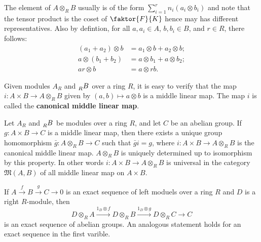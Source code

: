 \documentclass{article}
\begin{document}
The element of $A\otimes_R B$ usually is of the form $\sum_{i=1}^{r}n_{i}(a_{i}\otimes b_{i})$ and note that the tensor product is the coset of $\faktor{F}{K}$ hence may has different representatives. Also by defintion, for all $a,a_{i} \in A$, $b,b_{i} \in B$, and $r \in R$, there follows:
\begin{equation*}
    \begin{aligned}
    (a_{1}+a_{2})\otimes b &= a_{1}\otimes b + a_{2}\otimes b; \\
    a\otimes (b_{1}+b_{2}) &= a\otimes b_{1} + a\otimes b_{2}; \\
    ar\otimes b &= a\otimes rb.
    \end{aligned}
\end{equation*} 

Given modules $A_R$ and $\tensor[_R]{B}{}$ over a ring $R$, it is easy to verify that the map $i:A\times B\to A\otimes_R B$ given by $(a,b)\mapsto a\otimes b$ is a middle linear map. The map $i$ is called the \textbf{canonical middle linear map}.

\begin{theorem}
    Let $A_R$ and $\tensor[_R]{B}{}$ be modules over a ring $R$, and let $C$ be an abelian group. If $g:A\times B\to C$ is a middle linear map, then there exists a unique group homomorphism $\bar{g}:A\otimes_R B\to C$ such that $\bar{g}i=g$, where $i:A\times B \to A\otimes_R B$ is the canonical middle linear map. $A\otimes_R B$ is uniquely determined up to isomorphism by this property. In other words $i:A\times B\to A\otimes_R B$ is universal in the category $\mathfrak{M} (A,B)$ of all middle linear map on $A\times B$.
\end{theorem}

\begin{theorem}
    If $A\xrightarrow{f}B\xrightarrow{g}C\to 0$ is an exact sequence of left moduels over a ring $R$ and $D$ is a right $R$-module, then 
    \begin{equation*}
        D\otimes_R A\xrightarrow{1_D\otimes f}D\otimes_R B\xrightarrow{1_D\otimes g}D\otimes_R C\to C
    \end{equation*}
    is an exact sequence of abelian groups. An analogous statement holds for an exact sequence in the first varible.
\end{theorem}
\end{document}
